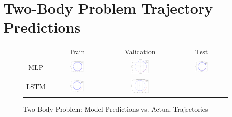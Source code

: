 \documentclass[12pt,a4paper]{article}
\begin{document}
\appendix
\section{Two-Body Problem Trajectory Predictions}
\begin{figure}[H]
  \centering
  \caption{Two-Body Problem: Model Predictions vs. Actual Trajectories}
  \label{fig:two_body_predictions}
  \begin{tabular}{cccc}
      & Train & Validation & Test \\
      MLP &
      \includegraphics[width=0.27\textwidth]{../inference_results/train/MLP/two_body/500/full_trajectory_spaceship_0.png} &
      \includegraphics[width=0.27\textwidth]{../inference_results/val/MLP/two_body/500/full_trajectory_spaceship_0.png} &
      \includegraphics[width=0.27\textwidth]{../inference_results/test/MLP/two_body/500/full_trajectory_spaceship_0.png} \\
      LSTM &
      \includegraphics[width=0.27\textwidth]{../inference_results/train/LSTM/two_body/500/full_trajectory_spaceship_0.png} &
      \includegraphics[width=0.27\textwidth]{../inference_results/val/LSTM/two_body/500/full_trajectory_spaceship_0.png} &

\end{tabular}
\end{figure}
\end{document}
